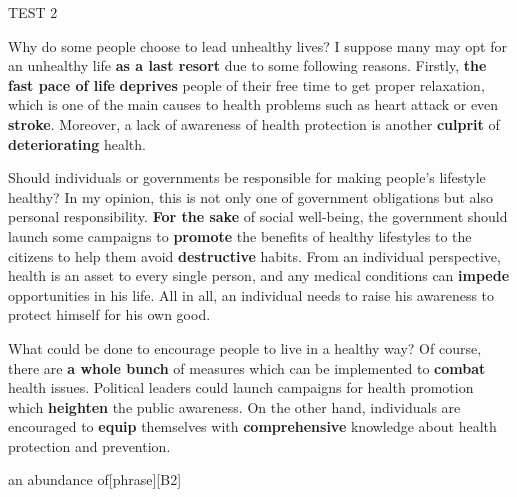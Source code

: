\begin{glossarymc}[Cambridge 6]
\begin{test}{TEST 2}
    \begin{qa}{Why do some people choose to lead unhealthy lives?}
    I suppose many may opt for an unhealthy life \textbf{as a last resort} due to some following reasons. Firstly, \textbf{the fast pace of life} \textbf{deprives} people of their free time to get proper relaxation, which is one of the main causes to health problems such as heart attack or even \textbf{stroke}. Moreover, a lack of awareness of health protection is another \textbf{culprit} of \textbf{deteriorating} health.
    \end{qa}

    \begin{qa}{Should individuals or governments be responsible for making people's lifestyle healthy?}
    In my opinion, this is not only one of government obligations but also personal responsibility. \textbf{For the sake} of social well-being, the government should launch some campaigns to \textbf{promote} the benefits of healthy lifestyles to the citizens to help them avoid \textbf{destructive} habits. From an individual perspective, health is an asset to every single person, and any medical conditions can \textbf{impede} opportunities in his life. All in all, an individual needs to raise his awareness to protect himself for his own good.
    \end{qa}

    \begin{qa}{What could be done to encourage people to live in a healthy way?}
    Of course, there are \textbf{a whole bunch} of measures which can be implemented to \textbf{combat} health issues. Political leaders could launch campaigns for health promotion which \textbf{heighten} the public awareness. On the other hand, individuals are encouraged to \textbf{equip} themselves with \textbf{comprehensive} knowledge about health protection and prevention.
    \end{qa}

        \begin{VocabExplain}[Part 3]
            \begin{ExplainCard}{an abundance of}[phrase][B2]
            \end{ExplainCard}


\end{VocabExplain}
\end{test}
\end{glossarymc}
